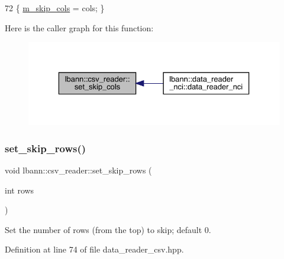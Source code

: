 \begin{DoxyCode}
72 \{ \hyperlink{classlbann_1_1csv__reader_a3a6cb698fbeb4abd0032e2b018bbb326}{m\_skip\_cols} = cols; \}
\end{DoxyCode}
Here is the caller graph for this function\+:\nopagebreak
\begin{figure}[H]
\begin{center}
\leavevmode
\includegraphics[width=329pt]{classlbann_1_1csv__reader_a1ab853e9c9a37a1e6c51811bf5be421b_icgraph}
\end{center}
\end{figure}
\mbox{\label{classlbann_1_1csv__reader_a7ec75f9bbf61073dd205871916578125}} 
\subsubsection{\texorpdfstring{set\+\_\+skip\+\_\+rows()}{set\_skip\_rows()}}
{\footnotesize\ttfamily void lbann\+::csv\+\_\+reader\+::set\+\_\+skip\+\_\+rows (\begin{DoxyParamCaption}\item[{int}]{rows }\end{DoxyParamCaption})\hspace{0.3cm}{\ttfamily [inline]}}



Set the number of rows (from the top) to skip; default 0. 



Definition at line 74 of file data\+\_\+reader\+\_\+csv.\+hpp.


